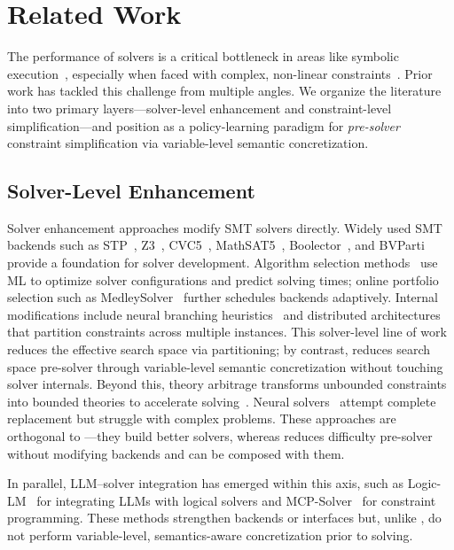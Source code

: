 \section{Related Work}
\label{sec:related}
The performance of \SMT{} solvers is a critical bottleneck in areas like symbolic execution~\cite{csmith, klee, sen2005cute}, especially when faced with complex, non-linear constraints~\cite{DBLP:conf/tacas/BischoffL21}. Prior work has tackled this challenge from multiple angles. We organize the literature into two primary layers---solver-level enhancement and constraint-level simplification---and position \tool as a policy-learning paradigm for \emph{pre-solver} constraint simplification via variable-level semantic concretization.


\subsection{Solver-Level Enhancement}
Solver enhancement approaches modify SMT solvers directly. Widely used SMT backends such as STP~\cite{stp2007}, Z3~\cite{demoura2008z3}, CVC5~\cite{cvc5}, MathSAT5~\cite{mathsat5}, Boolector~\cite{boolector2018}, and BVParti~\cite{bvparti2025} provide a foundation for solver development. Algorithm selection methods~\cite{DBLP:conf/tacas/BischoffL21, scott2023algorithm} use ML to optimize solver configurations and predict solving times; online portfolio selection such as MedleySolver~\cite{pimpalkhare2021medleysolver} further schedules backends adaptively. Internal modifications include neural branching heuristics~\cite{kurin2020improving, wang2021neurocomb} and distributed architectures~\cite{zhao2024distributed} that partition constraints across multiple instances. This solver-level line of work reduces the effective search space via partitioning; by contrast, \tool reduces search space pre-solver through variable-level semantic concretization without touching solver internals. Beyond this, theory arbitrage transforms unbounded constraints into bounded theories to accelerate solving~\cite{mikek2024sta}. Neural solvers~\cite{DBLP:conf/iclr/SelsamB19, DBLP:conf/nips/AbreuGMM21} attempt complete replacement but struggle with complex problems. These approaches are orthogonal to \tool---they build better solvers, whereas \tool reduces difficulty pre-solver without modifying backends and can be composed with them.

In parallel, LLM--solver integration has emerged within this axis, such as Logic-LM~\cite{pan2023logiclm} for integrating LLMs with logical solvers and MCP-Solver~\cite{szeider2025mcp} for constraint programming. These methods strengthen backends or interfaces but, unlike \tool, do not perform variable-level, semantics-aware concretization prior to solving.

